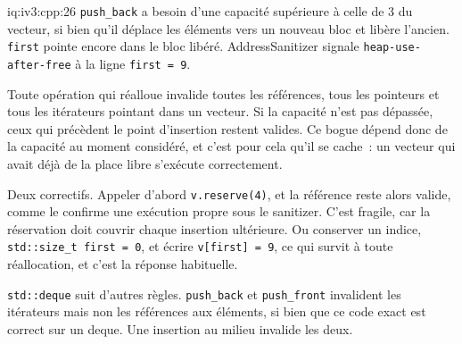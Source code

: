 \begin{solution}{iq:iv3:cpp:26}
\texttt{push\_back} a besoin d'une capacité supérieure à celle de 3 du vecteur, si bien qu'il déplace les éléments vers un nouveau bloc et libère l'ancien. \texttt{first} pointe encore dans le bloc libéré. AddressSanitizer signale \texttt{heap-use-after-free} à la ligne \texttt{first = 9}.

Toute opération qui réalloue invalide toutes les références, tous les pointeurs et tous les itérateurs pointant dans un vecteur. Si la capacité n'est pas dépassée, ceux qui précèdent le point d'insertion restent valides. Ce bogue dépend donc de la capacité au moment considéré, et c'est pour cela qu'il se cache~: un vecteur qui avait déjà de la place libre s'exécute correctement.

Deux correctifs. Appeler d'abord \texttt{v.reserve(4)}, et la référence reste alors valide, comme le confirme une exécution propre sous le sanitizer. C'est fragile, car la réservation doit couvrir chaque insertion ultérieure. Ou conserver un indice, \texttt{std::size\_t first = 0}, et écrire \texttt{v[first] = 9}, ce qui survit à toute réallocation, et c'est la réponse habituelle.

\texttt{std::deque} suit d'autres règles. \texttt{push\_back} et \texttt{push\_front} invalident les itérateurs mais non les références aux éléments, si bien que ce code exact est correct sur un deque. Une insertion au milieu invalide les deux.

\end{solution}

